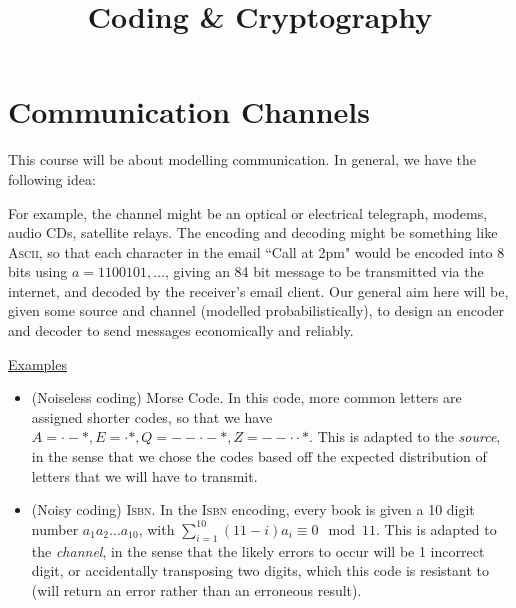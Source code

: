 \documentclass[10pt,a4paper]{article}
\title{Coding \& Cryptography}
\begin{document}
\maketitle

\setcounter{section}{-1}
\section{Communication Channels}
This course will be about modelling communication. In general, we have the following idea:

\begin{figure}[H]
\centering
{}
\end{figure}
\vspace{-1em}
For example, the channel might be an optical or electrical telegraph, modems, audio CDs, satellite relays. The encoding and decoding might be something like \textsc{Ascii}, so that each character in the email ``Call at 2pm" would be encoded into 8 bits using $a = 1100101, \ldots$, giving an 84 bit message to be transmitted via the internet, and decoded by the receiver's email client. Our general aim here will be, given some source and channel (modelled probabilistically), to design an encoder and decoder to send messages economically and reliably.

\underline{Examples}
\begin{itemize}
\item (Noiseless coding) Morse Code. In this code, more common letters are assigned shorter codes, so that we have $A = \cdot - \ast, E = \cdot \ast, Q = - - \cdot - \ast, Z = - - \cdot \cdot \ast$. This is adapted to the \textit{source}, in the sense that we chose the codes based off the expected distribution of letters that we will have to transmit.

\item (Noisy coding) \textsc{Isbn}. In the \textsc{Isbn} encoding, every book is given a 10 digit number $a_1a_2\ldots a_{10}$, with $\sum_{i=1}^{10} (11-i)a_i \equiv 0 \mod 11$. This is adapted to the \textit{channel}, in the sense that the likely errors to occur will be 1 incorrect digit, or accidentally transposing two digits, which this code is resistant to (will return an error rather than an erroneous result).
\end{itemize}
\end{document}

